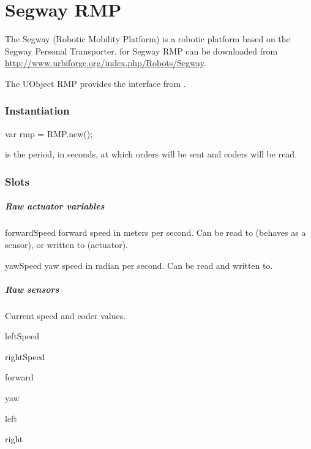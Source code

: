 
\chapter{Segway RMP}
\label{sec:segway-rmp}

The Segway  (Robotic Mobility Platform) is a robotic platform based
on the Segway Personal Transporter.  \urbi for Segway RMP can be downloaded
from \url{http://www.urbiforge.org/index.php/Robots/Segway}.

The UObject RMP provides the interface from \urbi.

\subsection{Instantiation}

\begin{urbiunchecked}
var rmp = RMP.new();
\end{urbiunchecked}

 is the period, in seconds, at which orders will be sent and
coders will be read.

\subsection{Slots}

\paragraph{Raw actuator variables}

\begin{urbiscriptapi}
\item[forwardSpeed] forward speed in meters per second.  Can be read to
  (behaves as a sensor), or written to (actuator).
\item[yawSpeed] yaw speed in radian per second.  Can be read and written
  to.
\end{urbiscriptapi}

\paragraph{Raw sensors}
Current speed and coder values.
\begin{urbiscriptapi}
\item[leftSpeed]
\item[rightSpeed]
\item[forward]
\item[yaw]
\item[left]
\item[right]
\end{urbiscriptapi}

